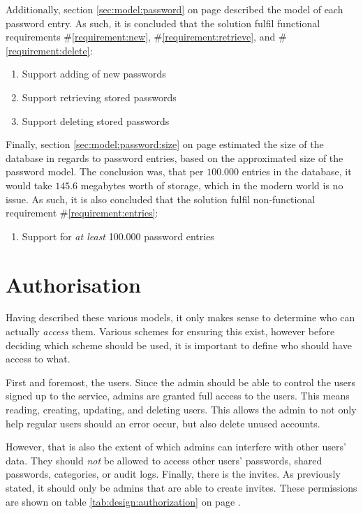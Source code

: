 			Additionally, section \ref{sec:model:password} on page \pageref{sec:model:password} described the model of each password entry. As such, it is concluded that the solution fulfil functional requirements \#\ref{requirement:new}, \#\ref{requirement:retrieve}, and \#\ref{requirement:delete}:
			\vspace{-3ex}\begin{enumerate}
				\setlength\itemsep{0.1em}
				\setcounter{enumi}{10-1}
				\item Support adding of new passwords
				\item Support retrieving stored passwords
				\item Support deleting stored passwords
			\end{enumerate}

			Finally, section \ref{sec:model:password:size} on page \pageref{sec:model:password:size} estimated the size of the database in regards to password entries, based on the approximated size of the password model. The conclusion was, that per $100.000$ entries in the database, it would take $145.6$ megabytes worth of storage, which in the modern world is no issue. As such, it is also concluded that the solution fulfil non-functional requirement \#\ref{requirement:entries}:
			\vspace{-3ex}\begin{enumerate}
				\setlength\itemsep{0.1em}
				\setcounter{enumi}{3-1}
				\item Support for \emph{at least} 100.000 password entries
			\end{enumerate}

	\section{Authorisation}
		\label{sec:design:authorization}
		Having described these various models, it only makes sense to determine who can actually \emph{access} them. Various schemes for ensuring this exist, however before deciding which scheme should be used, it is important to define who should have access to what.

		First and foremost, the users. Since the admin should be able to control the users signed up to the service, admins are granted full access to the users. This means reading, creating, updating, and deleting users. This allows the admin to not only help regular users should an error occur, but also delete unused accounts. 

		However, that is also the extent of which admins can interfere with other users' data. They should \emph{not} be allowed to access other users' passwords, shared passwords, categories, or audit logs. Finally, there is the invites. As previously stated, it should only be admins that are able to create invites. These permissions are shown on table \ref{tab:design:authorization} on page \pageref{tab:design:authorization}.

